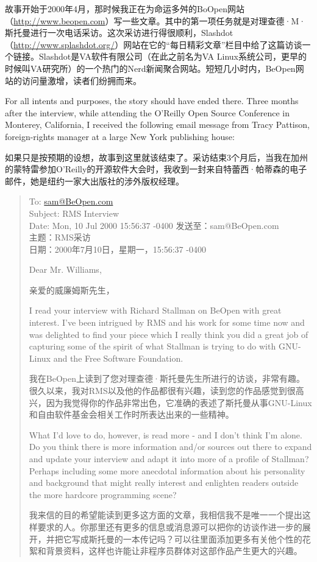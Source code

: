 \ifdefined\chs
故事开始于2000年4月，那时候我正在为命运多舛的BoOpen网站（\url{http://www.beopen.com}）写一些文章。其中的第一项任务就是对理查德·M·斯托曼进行一次电话采访。这次采访进行得很顺利，Slashdot（\url{http://www.splashdot.org/}）网站在它的``每日精彩文章''栏目中给了这篇访谈一个链接。Slashdot是VA软件有限公司（在此之前名为VA Linux系统公司，更早的时候叫VA研究所）的一个热门的Nerd新闻聚合网站。短短几小时内，BeOpen网站的访问量激增，读者们纷拥而来。
\fi

\ifdefined\eng
For all intents and purposes, the story should have ended there. Three months after the interview, while attending the O'Reilly Open Source Conference in Monterey, California, I received the following email message from Tracy Pattison, foreign-rights manager at a large New York publishing house:
\fi

\ifdefined\chs
如果只是按预期的设想，故事到这里就该结束了。采访结束3个月后，当我在加州的蒙特雷参加O'Reilly的开源软件大会时，我收到一封来自特蕾西·帕蒂森的电子邮件，她是纽约一家大出版社的涉外版权经理。
\fi

\begin{quote}
\ifdefined\eng
To: \url{sam@BeOpen.com}\\Subject: RMS Interview\\Date: Mon, 10 Jul 2000 15:56:37 -0400
\fi
\ifdefined\chs
发送至：sam@BeOpen.com\\主题：RMS采访\\日期：2000年7月10日，星期一，15:56:37 -0400
\fi

\ifdefined\eng
Dear Mr. Williams,
\fi

\ifdefined\chs
亲爱的威廉姆斯先生，
\fi

\ifdefined\eng
I read your interview with Richard Stallman on BeOpen with great interest. I've been intrigued by RMS and his work for some time now and was delighted to find your piece which I really think you did a great job of capturing some of the spirit of what Stallman is trying to do with GNU-Linux and the Free Software Foundation.
\fi

\ifdefined\chs
我在BeOpen上读到了您对理查德·斯托曼先生所进行的访谈，非常有趣。很久以来，我对RMS以及他的作品都很有兴趣，读到您的作品感觉到很高兴，因为我觉得你的作品非常出色，它准确的表述了斯托曼从事GNU-Linux和自由软件基金会相关工作时所表达出来的一些精神。
\fi

\ifdefined\eng
What I'd love to do, however, is read more - and I don't think I'm alone. Do you think there is more information and/or sources out there to expand and update your interview and adapt it into more of a profile of Stallman? Perhaps including some more anecdotal information about his personality and background that might really interest and enlighten readers outside the more hardcore programming scene?
\fi

\ifdefined\chs
我来信的目的希望能读到更多这方面的文章，我相信我不是唯一一个提出这样要求的人。你那里还有更多的信息或消息源可以把你的访谈作进一步的展开，并把它写成斯托曼的一本传记吗？可以往里面添加更多有关他个性的花絮和背景资料，这样也许能让非程序员群体对这部作品产生更大的兴趣。
\fi
\end{quote}

